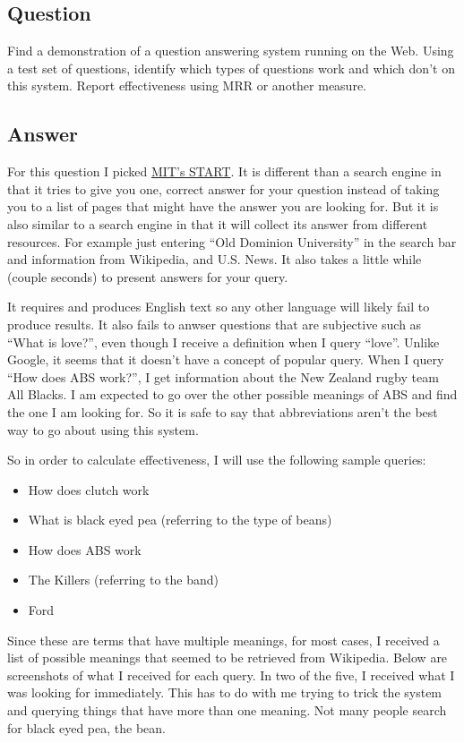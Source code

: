 \documentclass[10pt,letterpaper,bibliography=totoc]{scrartcl}
\begin{document}
\subsection{Question}
Find a demonstration of a question answering system running on the Web. Using a test set of questions, identify which types of questions work and which don’t on this system. Report effectiveness using MRR or another measure.

\subsection{Answer}
For this question I picked \href{http://start.csail.mit.edu/index.php}{MIT's START}. It is different than a search engine in that it tries to give you one, correct answer for your question instead of taking you to a list of pages that might have the answer you are looking for. But it is also similar to a search engine in that it will collect its answer from different resources. For example just entering ``Old Dominion University'' in the search bar and information from Wikipedia, and U.S. News. It also takes a little while (couple seconds) to present answers for your query.

It requires and produces English text so any other language will likely fail to produce results. It also fails to anwser questions that are subjective such as ``What is love?'', even though I receive a definition when I query ``love''. Unlike Google, it seems that it doesn't have a concept of popular query. When I query ``How does ABS work?'', I get information about the New Zealand rugby team All Blacks. I am expected to go over the other possible meanings of ABS and find the one I am looking for. So it is safe to say that abbreviations aren't the best way to go about using this system. 

So in order to calculate effectiveness, I will use the following sample queries:
\begin{itemize}
    \item How does clutch work
    \item What is black eyed pea (referring to the type of beans)
    \item How does ABS work
    \item The Killers (referring to the band)
    \item Ford
\end{itemize}

Since these are terms that have multiple meanings, for most cases, I received a list of possible meanings that seemed to be retrieved from Wikipedia. Below are screenshots of what I received for each query. In two of the five, I received what I was looking for immediately. This has to do with me trying to trick the system and querying things that have more than one meaning. Not many people search for black eyed pea, the bean.
\end{document}
